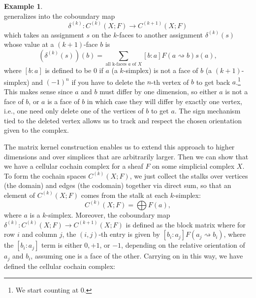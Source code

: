 \documentclass[a4paper]{book}
\theoremstyle{definition}
\newtheorem{example}{Example}[section]
\theoremstyle{definition}
\theoremstyle{definition}
\theoremstyle{theorem}
\theoremstyle{definition}
\begin{document}
\begin{example}
\begin{equation*}
  \end{equation*}
  generalizes into the coboundary map 
  \begin{equation*}
  \delta^{(k)}: C^{(k)}(X; F) \rightarrow C^{(k+1)}(X;F)
  \end{equation*}
  which takes an assignment $s$ on the $k$-faces to another assignment $\delta^{(k)}(s)$ whose value at a $(k+1)$-face $b$ is 
  \begin{equation}
  (\delta^{(k)}(s))(b) = \sum_{\text{all k-faces } a \text{ of } X} [b:a] F(a \rightsquigarrow b) s(a),
  \end{equation} 
  where $[b:a]$ is defined to be $0$ if $a$ (a $k$-simplex) is not a face of $b$ (a $(k+1)$-simplex) and $(-1)^n$ if you have to delete the $n$-th vertex of $b$ to get back $a$.\footnote{We start counting at 0.} This makes sense since $a$ and $b$ must differ by one dimension, so either $a$ is not a face of $b$, or $a$ is a face of $b$ in which case they will differ by exactly one vertex, i.e., one need only delete one of the vertices of $b$ to get $a$. The sign mechanism tied to the deleted vertex allows us to track and respect the chosen orientation given to the complex.\par  
 The matrix kernel construction enables us to extend this approach to higher dimensions and over simplices that are arbitrarily larger. Then we can show that we have a cellular cochain complex for a sheaf $F$ on some simplicial complex $X$. To form the cochain spaces $C^{(k)}(X;F)$, we just collect the stalks over vertices (the domain) and edges (the codomain) together via direct sum, so that an element of $C^{(k)}(X;F)$ comes from the stalk at each $k$-simplex: 
	\begin{equation}
	C^{(k)}(X;F) = \bigoplus F(a),
	\end{equation}
	where $a$ is a $k$-simplex. Moreover, the coboundary map $\delta^{(k)}: C^{(k)}(X;F) \rightarrow C^{(k+1)}(X;F)$ is defined as the block matrix where for row $i$ and column $j$, the $(i,j)$-th entry is given by $[b_i: a_j]F(a_j \rightsquigarrow b_i)$, where the $[b_i:a_j]$ term is either $0, +1$, or $-1$, depending on the relative orientation of $a_j$ and $b_i$, assuming one is a face of the other. Carrying on in this way, we have defined the cellular cochain complex: 
	\par 
\end{example}
\end{document}
